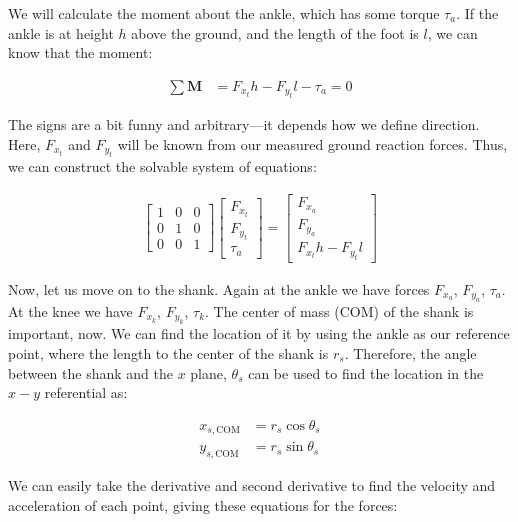 We will calculate the moment about the ankle, which has some torque $\tau_a$. If the ankle is at height $h$ above the ground, and the length of the foot is $l$, we can know that the moment:

\begin{equation}
\begin{split}
    \sum \mathbf{M} &= F_{x_t}h - F_{y_t}l - \tau_a = 0
\end{split}
\end{equation}

The signs are a bit funny and arbitrary---it depends how we define direction. Here, $F_{x_t}$ and $F_{y_t}$ will be known from our measured ground reaction forces. Thus, we can construct the solvable system of equations: 

\begin{align}
\begin{bmatrix}
    1 & 0 & 0 \\
    0 & 1 & 0 \\
    0 & 0 & 1  
\end{bmatrix}
\begin{bmatrix}
    F_{x_t} \\
    F_{y_t} \\
    \tau_a 
\end{bmatrix}
= 
\begin{bmatrix}
    F_{x_a} \\
    F_{y_a} \\
    F_{x_t}h - F_{y_t}l
\end{bmatrix}
\end{align}

Now, let us move on to the shank. Again at the ankle we have forces $F_{x_a}$, $F_{y_a}$, $\tau_a$. At the knee we have $F_{x_k}$, $F_{y_k}$, $\tau_k$. The center of mass (COM) of the shank is important, now. We can find the location of it by using the ankle as our reference point, where the length to the center of the shank is $r_s$. Therefore, the angle between the shank and the $x$ plane, $\theta_s$ can be used to find the location in the $x-y$ referential as:

\begin{equation}
\begin{split}
    x_{s,\mathrm{COM}} &= r_s\cos{\theta_s} \\
    y_{s,\mathrm{COM}} &= r_s\sin{\theta_s}
\end{split}
\end{equation}

We can easily take the derivative and second derivative to find the velocity and acceleration of each point, giving these equations for the forces: 

